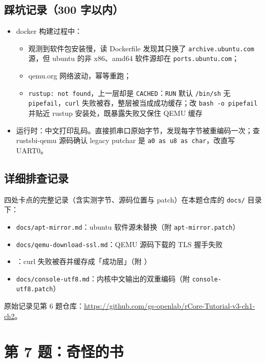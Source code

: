 \documentclass[a4paper, 12pt, linespread=1.35]{ctexart}   %
\begin{document}
\subsection{踩坑记录（300 字以内）}
\label{sec:q6-record}
\begin{itemize}
  \item docker 构建过程中：
    \begin{itemize}
      \item 观测到软件包安装慢，读 Dockerfile 发现其只换了 \texttt{archive.ubuntu.com} 源，但 ubuntu 的非 x86、amd64 软件源却在 \texttt{ports.ubuntu.com}；
      \item qemu.org 网络波动，幂等重跑；
      \item \texttt{rustup: not found}，上一层却是 \texttt{CACHED}：\texttt{RUN} 默认 \texttt{/bin/sh} 无 \texttt{pipefail}，\texttt{curl} 失败被吞，整层被当成成功缓存；改 \texttt{bash -o pipefail} 并贴近 rustup 安装处，既暴露失败又保住 QEMU 缓存
    \end{itemize}
  \item 运行时：中文打印乱码。直接抓串口原始字节，发现每字节被重编码一次；查 rustsbi-qemu 源码确认 legacy putchar 是 \texttt{a0 as u8 as char}，改直写 UART0。
\end{itemize}

\subsection{详细排查记录}
四处卡点的完整记录（含实测字节、源码位置与 patch）在本题仓库的 \texttt{docs/} 目录下：

\begin{itemize}
  \item \texttt{docs/apt-mirror.md}：ubuntu 软件源未替换（附 \texttt{apt-mirror.patch}）
  \item \texttt{docs/qemu-download-ssl.md}：QEMU 源码下载的 TLS 握手失败
  \item {}：curl 失败被吞并缓存成「成功层」（附 ）
  \item \texttt{docs/console-utf8.md}：内核中文输出的双重编码（附 \texttt{console-utf8.patch}）
\end{itemize}

原始记录见第 6 题仓库：\url{https://github.com/gs-openlab/rCore-Tutorial-v3-ch1-ch2}。

\section{第 7 题：奇怪的书}
\end{document}
